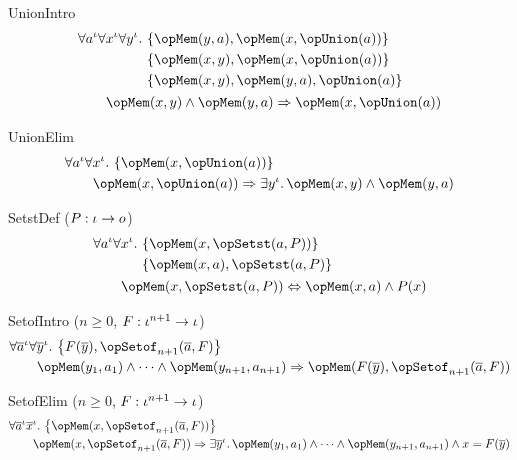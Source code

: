\documentclass[11pt, a4paper, oneside]{article}
\begin{document}
\begin{axioms}
\item[UnionIntro] \[
        \begin{aligned}
            &\forall a^\idv \forall x^\idv \forall y^\idv.\, \begin{aligned}[t]
                &\st{ \opMem(y, a), \opMem(x, \opUnion(a)) } \\
                &\st{ \opMem(x, y), \opMem(x, \opUnion(a)) } \\
                &\st{ \opMem(x, y), \opMem(y, a), \opUnion(a) }
            \end{aligned} \\
            &\qquad \opMem(x, y) \wedge \opMem(y, a) \imp \opMem(x, \opUnion(a))
        \end{aligned}
    \]

\item[UnionElim] \[
        \begin{aligned}
            &\forall a^\idv \forall x^\idv.\, \st{ \opMem(x, \opUnion(a)) } \\
            &\qquad \opMem(x, \opUnion(a)) \imp \exists y^\idv.\, \opMem(x, y) \wedge \opMem(y, a)
        \end{aligned}
    \]

\item[SetstDef ($P : \iota \rightarrow o$)] \[
        \begin{aligned}
            &\forall a^\idv \forall x^\idv.\, \begin{aligned}[t]
                &\st{ \opMem(x, \opSetst(a, P)) } \\
                &\st{ \opMem(x, a), \opSetst(a, P) }
            \end{aligned} \\
            &\qquad \opMem(x, \opSetst(a, P)) \eqv \opMem(x, a) \wedge P(x)
        \end{aligned}
    \]

\item[SetofIntro ($n \ge 0$, $F : \iota^{n+1} \rightarrow \iota$)] \[
        \begin{aligned}
            &\forall \overline{a}^\idv \forall \overline{y}^\idv.\, \st{ F(\overline{y}), \opSetof_{n+1}(\overline{a}, F) } \\
            &\qquad \opMem(y_1, a_1) \wedge \dots \wedge \opMem(y_{n+1}, a_{n+1}) \imp \opMem(F(\overline{y}), \opSetof_{n+1}(\overline{a}, F))
        \end{aligned}
    \]

\item[SetofElim ($n \ge 0$, $F : \iota^{n+1} \rightarrow \iota$)] \[
        \begin{aligned}
            &\forall \overline{a}^\idv \overline{x}^\idv.\, \st{ \opMem(x, \opSetof_{n+1}(\overline{a}, F)) } \\
            &\qquad \opMem(x, \opSetof_{n+1}(\overline{a}, F)) \imp \exists \overline{y}^\idv.\, \opMem(y_1, a_1) \wedge \dots \wedge \opMem(y_{n+1}, a_{n+1}) \wedge x = F(\overline{y})
        \end{aligned}
    \]


\end{axioms}
\end{document}
